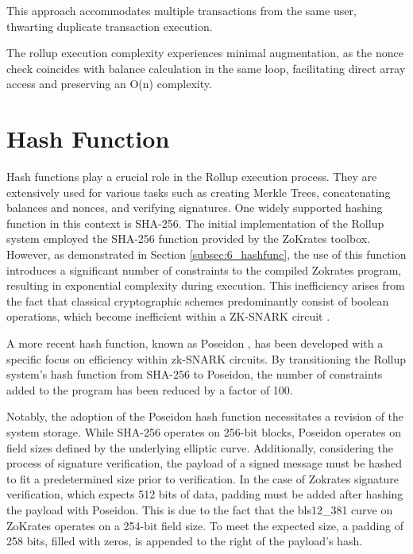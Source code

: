 This approach accommodates multiple transactions from the same user, thwarting duplicate transaction execution.

The rollup execution complexity experiences minimal augmentation, as the nonce check coincides with balance calculation in the same loop, facilitating direct array access and preserving an O(n) complexity.

\section{Hash Function}

Hash functions play a crucial role in the Rollup execution process. They are extensively used for various tasks such as creating Merkle Trees, concatenating balances and nonces, and verifying signatures. One widely supported hashing function in this context is SHA-256. The initial implementation of the Rollup system employed the SHA-256 function provided by the ZoKrates toolbox. However, as demonstrated in Section \ref{subsec:6_hashfunc}, the use of this function introduces a significant number of constraints to the compiled Zokrates program, resulting in exponential complexity during execution. This inefficiency arises from the fact that classical cryptographic schemes predominantly consist of boolean operations, which become inefficient within a ZK-SNARK circuit \cite{belles-munoz_twisted_2021}.

A more recent hash function, known as Poseidon \cite{grassi_poseidon_nodate}, has been developed with a specific focus on efficiency within zk-SNARK circuits. By transitioning the Rollup system's hash function from SHA-256 to Poseidon, the number of constraints added to the program has been reduced by a factor of 100.

Notably, the adoption of the Poseidon hash function necessitates a revision of the system storage. While SHA-256 operates on 256-bit blocks, Poseidon operates on field sizes defined by the underlying elliptic curve. Additionally, considering the process of signature verification, the payload of a signed message must be hashed to fit a predetermined size prior to verification. In the case of Zokrates signature verification, which expects 512 bits of data, padding must be added after hashing the payload with Poseidon. This is due to the fact that the bls12\_381 curve on ZoKrates operates on a 254-bit field size. To meet the expected size, a padding of 258 bits, filled with zeros, is appended to the right of the payload's hash.


